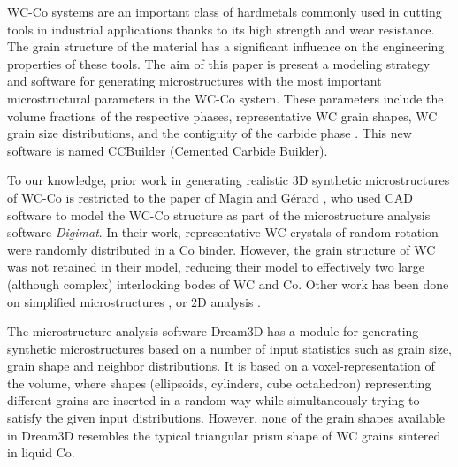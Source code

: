 \documentclass[3p,12pt]{elsarticle}
\begin{document}
WC-Co systems are an important class of hardmetals commonly used in cutting tools in industrial applications thanks to its high strength and wear resistance.
The grain structure of the material has a significant influence on the engineering properties of these tools.
The aim of this paper is present a modeling strategy and software for generating microstructures with the most important microstructural parameters in the WC-Co system.
These parameters include the volume fractions of the respective phases, representative WC grain shapes, WC grain size distributions, and the contiguity of the carbide phase \cite{spiegler_finite_1992,lay_microstructure_2014}. This new software is named CCBuilder (Cemented Carbide Builder).

To our knowledge, prior work in generating realistic 3D synthetic microstructures of WC-Co is restricted to the paper of Magin and G{\'e}rard \cite{magin_microstructural_2009}, who used CAD software to model the WC-Co structure as part of the microstructure analysis software \textit{Digimat}.
In their work, representative WC crystals of random rotation were randomly distributed in a Co binder.
However, the grain structure of WC was not retained in their model, reducing their model to effectively two large (although complex) interlocking bodes of WC and Co.
Other work has been done on simplified microstructures \cite{mari_finite_2015, livescu_measurement_2005}, or 2D analysis \cite{chen_statistics_2013,ozden_mesoscopical_2015}.


The microstructure analysis software Dream3D \cite{groeber_dream.3d:_2014} has a module for generating synthetic microstructures based on a number of input statistics such as grain size, grain shape and neighbor distributions.
It is based on a voxel-representation of the volume, where shapes (ellipsoids, cylinders, cube octahedron) representing different grains are inserted in a random way while simultaneously trying to satisfy the given input distributions.
However, none of the grain shapes available in Dream3D resembles the typical triangular prism shape of WC grains sintered in liquid Co.
\end{document}
